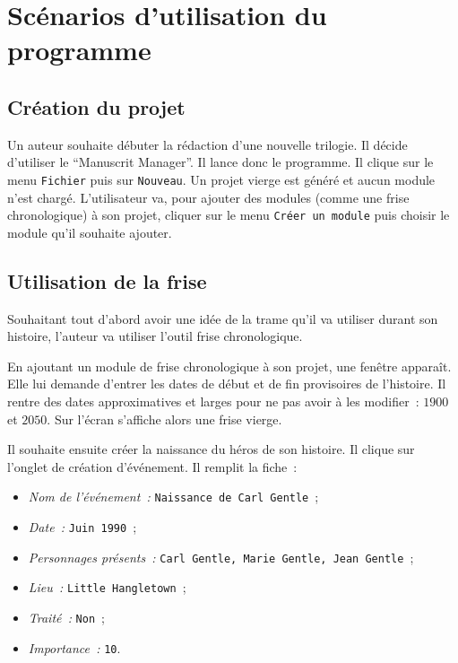 \documentclass[a4paper,11pt,twoside]{article}
\begin{document}
\section{Scénarios d'utilisation du programme}
\subsection{Création du projet}
Un auteur souhaite débuter la rédaction d'une nouvelle trilogie. Il décide d'utiliser le ``Manuscrit Manager''. Il lance donc le programme. Il clique sur le menu \texttt{Fichier} puis sur \texttt{Nouveau}. Un projet vierge est généré et aucun module n'est chargé. L'utilisateur va, pour ajouter des modules (comme une frise chronologique) à son projet, cliquer sur le menu \texttt{Créer un module} puis choisir le module qu'il souhaite ajouter.

\subsection{Utilisation de la frise}
Souhaitant tout d'abord avoir une idée de la trame qu'il va utiliser durant son histoire, l'auteur va utiliser l'outil frise chronologique.

En ajoutant un module de frise chronologique à son projet, une fenêtre apparaît. Elle lui demande d'entrer les dates de début et de fin provisoires de l'histoire. Il rentre des dates approximatives et larges pour ne pas avoir à les modifier~: $1900$ et $2050$. Sur l'écran s'affiche alors une frise vierge. 

Il souhaite ensuite créer la naissance du héros de son histoire. Il clique sur l'onglet de création d'événement. Il remplit la fiche~:
\begin{itemize}
	\item \textit{Nom de l'événement~:} \texttt{Naissance de Carl Gentle}~;
    \item \textit{Date~:} \texttt{Juin 1990}~;
    \item \textit{Personnages présents~:} \texttt{Carl Gentle, Marie Gentle, Jean Gentle}~;
    \item \textit{Lieu~:} \texttt{Little Hangletown}~;
    \item \textit{Traité~:} \texttt{Non}~;
    \item \textit{Importance~:} \texttt{10}.
\end{itemize}
\end{document}
